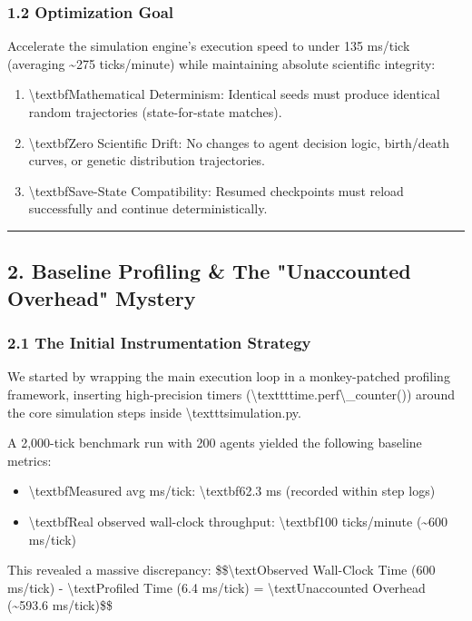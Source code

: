 \documentclass[11pt,a4paper]{article}
\begin{document}
\subsubsection*{1.2 Optimization Goal}
Accelerate the simulation engine's execution speed to under 135 ms/tick (averaging \textasciitilde{}275 ticks/minute) while maintaining absolute scientific integrity:
\begin{enumerate}
  \item \textbackslash{}textbf{Mathematical Determinism:} Identical seeds must produce identical random trajectories (state-for-state matches).
  \item \textbackslash{}textbf{Zero Scientific Drift:} No changes to agent decision logic, birth/death curves, or genetic distribution trajectories.
  \item \textbackslash{}textbf{Save-State Compatibility:} Resumed checkpoints must reload successfully and continue deterministically.
\end{enumerate}

\noindent\rule{\textwidth}{0.4pt}

\subsection*{2. Baseline Profiling \& The "Unaccounted Overhead" Mystery}

\subsubsection*{2.1 The Initial Instrumentation Strategy}
We started by wrapping the main execution loop in a monkey-patched profiling framework, inserting high-precision timers (\textbackslash{}texttt{time.perf\textbackslash{}\_counter()}) around the core simulation steps inside \textbackslash{}texttt{simulation.py}.

A 2,000-tick benchmark run with 200 agents yielded the following baseline metrics:
\begin{itemize}
  \item \textbackslash{}textbf{Measured avg ms/tick:} \textbackslash{}textbf{62.3 ms} (recorded within step logs)
  \item \textbackslash{}textbf{Real observed wall-clock throughput:} \textbackslash{}textbf{100 ticks/minute (\textasciitilde{}600 ms/tick)}
\end{itemize}

This revealed a massive discrepancy:
\$\$\textbackslash{}text{Observed Wall-Clock Time (600 ms/tick)} - \textbackslash{}text{Profiled Time (6.4 ms/tick)} = \textbackslash{}text{Unaccounted Overhead (\textasciitilde{}593.6 ms/tick)}\$\$
\end{document}
